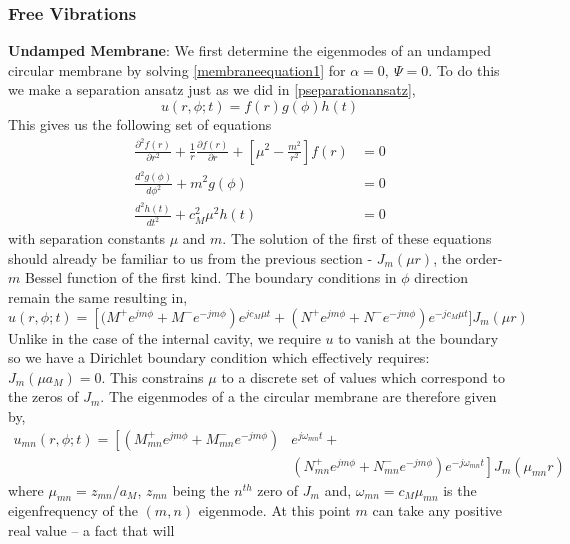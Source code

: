 \subsubsection*{Free Vibrations}
\noindent\textbf{Undamped Membrane}: We first determine the eigenmodes of an undamped circular membrane by solving \eqref{membraneequation1} for $\alpha=0,\ \Psi=0$. To do this 
we make a separation ansatz just as we did in \eqref{pseparationansatz},
\begin{equation}\label{mseparationansatz}
 u(r,\phi;t)=f(r)g(\phi)h(t)
\end{equation}
This gives us the following set of equations
\begin{align}
 \frac{\partial^2 f(r)}{\partial r^2} + \frac{1}{r}\frac{\partial f(r)}{\partial r}+\left[\mu^2-\frac{m^2}{r^2}\right]f(r)&=0\label{besselequation2}\\
  \frac{d^2 g(\phi)}{d\phi^2}+m^2g(\phi)&=0\\
 \frac{d^2 h(t)}{dt^2}+c^2_M\mu^2h(t)&=0
\end{align}
with separation constants $\mu$ and $m$. The solution of the first of these equations should already be familiar to us from the previous section - $J_m(\mu r)$,
 the order-$m$ Bessel function of the first kind. The boundary conditions in $\phi$ direction remain the same resulting in,
\begin{equation}\label{specificmembrane1}
 u(r,\phi;t)=\left[(M^+e^{jm\phi}+M^-e^{-jm\phi}\right)e^{jc_M\mu t}+(N^+e^{jm\phi}+N^-e^{-jm\phi})e^{-jc_M\mu t}] J_m(\mu r)
\end{equation}
Unlike in the case of the internal cavity, we require $u$ to vanish at the boundary so we have a Dirichlet boundary condition which
effectively requires: $J_m(\mu a_M)=0$. This constrains $\mu$ to a discrete set of values which correspond to the zeros of $J_m$. The eigenmodes of a 
the circular membrane are therefore given by,
\begin{equation}\label{membraneeigen}
\begin{split}
 u_{mn}(r,\phi;t)=\left[(M^+_{mn}e^{jm\phi}+M^-_{mn}e^{-jm\phi})\right.& e^{j\omega_{mn} t}+ \\
 &\left.(N^+_{mn}e^{jm\phi}+N^-_{mn}e^{-jm\phi})e^{-j\omega_{mn} t}\right] J_m(\mu_{mn} r)
 \end{split}
\end{equation}
where $\mu_{mn}=z_{mn}/a_M$, $z_{mn}$ being the $n^{th}$ zero of $J_m$ and, $\omega_{mn}=c_M\mu_{mn}$ is
the eigenfrequency of the $(m,n)$ eigenmode. At this point $m$ can take any positive real value -- a fact that will
